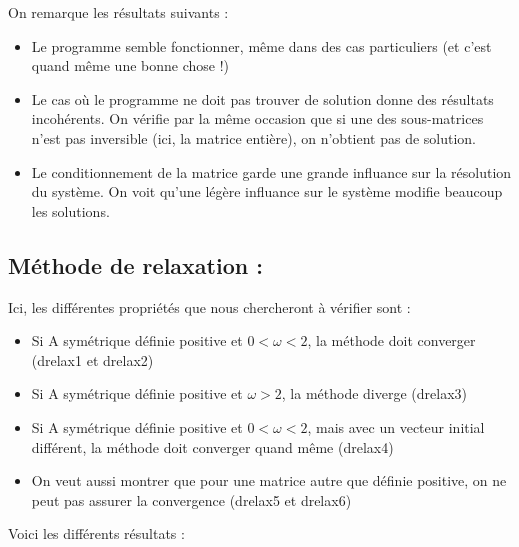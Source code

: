 \documentclass{article}
\theoremstyle{mes_theoremes}
\begin{document}
\newpage
On remarque les résultats suivants :
\begin{itemize}
\item Le programme semble fonctionner, même dans des cas particuliers (et c'est quand même une bonne chose !)
\item Le cas où le programme ne doit pas trouver de solution donne des résultats incohérents. On vérifie par la même occasion que si une des sous-matrices n'est pas inversible (ici, la matrice entière), on n'obtient pas de solution.
\item Le conditionnement de la matrice garde une grande influance sur la résolution du système. On voit qu'une légère influance sur le système modifie beaucoup les solutions.
\end{itemize}

\newpage
\textcolor{bleu}{\section*{Méthode de relaxation :}}
Ici, les différentes propriétés que nous chercheront à vérifier sont :
\begin{itemize}
\item Si A symétrique définie positive et $0<\omega<2$, la méthode doit converger (drelax1 et drelax2)
\item Si A symétrique définie positive et $\omega>2$, la méthode diverge (drelax3)
\item Si A symétrique définie positive et $0<\omega<2$, mais avec un vecteur initial différent, la méthode doit converger quand même (drelax4)
\item On veut aussi montrer que pour une matrice autre que définie positive, on ne peut pas assurer la convergence (drelax5 et drelax6)
\end{itemize}

\bigskip
Voici les différents résultats : 
\end{document}

